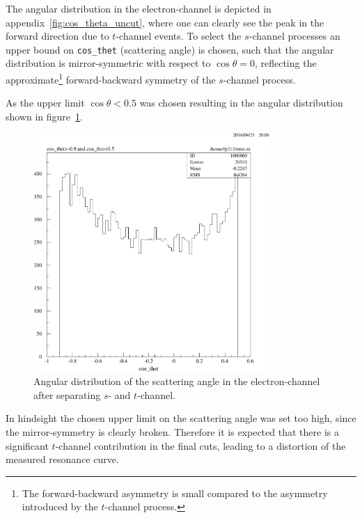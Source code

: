 \documentclass[11pt, a4paper]{article}
\numberwithin{equation}{section}
\begin{document}
The angular distribution in the electron-channel is depicted in appendix~\ref{fig:cos_theta_uncut}, where one can clearly see the peak in the forward direction due to $t$-channel events.
To select the $s$-channel processes an upper bound on \texttt{cos\_thet} (scattering angle) is chosen, such that the angular distribution is mirror-symmetric with respect to $\cos\theta = 0$, reflecting the approximate\footnote{The forward-backward asymmetry is small compared to the asymmetry introduced by the $t$-channel process.} forward-backward symmetry of the $s$-channel process.

As the upper limit $\cos\theta < 0.5$ was chosen resulting in the angular distribution shown in figure~\ref{fig:t_cut_distribution}.
\begin{figure}[h]
	\centering
	\includegraphics[width=0.8\textwidth]{./data/tag2/angular_mc/cropped/t_channel_cut.pdf}
	\caption{Angular distribution of the scattering angle in the electron-channel after separating $s$- and $t$-channel.}
	\label{fig:t_cut_distribution}
\end{figure}
In hindsight the chosen upper limit on the scattering angle was set too high, since the mirror-symmetry is clearly broken.
Therefore it is expected that there is a significant $t$-channel contribution in the final cuts, leading to a distortion of the measured resonance curve.
\end{document}
